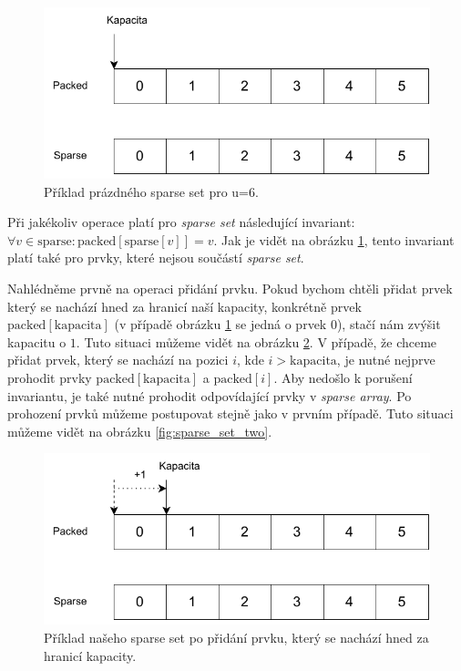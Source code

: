 \begin{figure}
    \centering
    \includegraphics[width=0.6\linewidth]{img/sparse_set_empty.pdf}
    \caption{Příklad prázdného sparse set pro u=6.}
    \label{fig:sparse_set_empty}
\end{figure}

Při jakékoliv operace platí pro \textit{sparse set} následující invariant: $\forall v \in \text{sparse}: \text{packed}\left[\text{sparse}\left[v\right]\right] = v$. Jak je vidět na obrázku \ref{fig:sparse_set_empty}, tento invariant platí také pro prvky, které nejsou součástí \textit{sparse set}.

Nahlédněme prvně na operaci přidání prvku. Pokud bychom chtěli přidat prvek který se nachází hned za hranicí naší kapacity, konkrétně prvek $\text{packed}\left[\text{kapacita}\right]$ (v případě obrázku \ref{fig:sparse_set_empty} se jedná o prvek $0$), stačí nám zvýšit kapacitu o $1$. Tuto situaci můžeme vidět na obrázku \ref{fig:sparse_set_one}. V případě, že chceme přidat prvek, který se nachází na pozici $i$, kde $i > \text{kapacita}$, je nutné nejprve prohodit prvky $\text{packed}\left[\text{kapacita}\right]$ a $\text{packed}\left[i\right]$. Aby nedošlo k porušení invariantu, je také nutné prohodit odpovídající prvky v \textit{sparse array}. Po prohození prvků můžeme postupovat stejně jako v prvním případě. Tuto situaci můžeme vidět na obrázku \ref{fig:sparse_set_two}.

\begin{figure}
    \centering
    \includegraphics[width=0.6\linewidth]{img/sparse_set_one.pdf}
    \caption{Příklad našeho sparse set po přidání prvku, který se nachází hned za hranicí kapacity.}
    \label{fig:sparse_set_one}
\end{figure}

